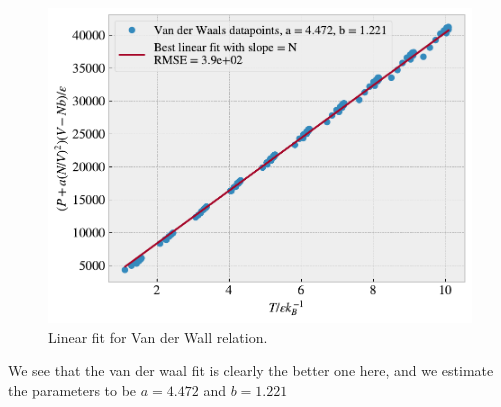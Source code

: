 \documentclass[reprint, amsmath, amssymb, aps]{revtex4-2}
\begin{document}
\begin{figure}[H]
  \includegraphics[width=\linewidth]{figures/TRP_waal.pdf}
  \caption{Linear fit for Van der Wall relation.}
  \label{fig:TRP_waal}
\end{figure}

We see that the van der waal fit is clearly the better one here, and we estimate the parameters to be $a = 4.472$ and $b = 1.221$
%
%
\end{document}
